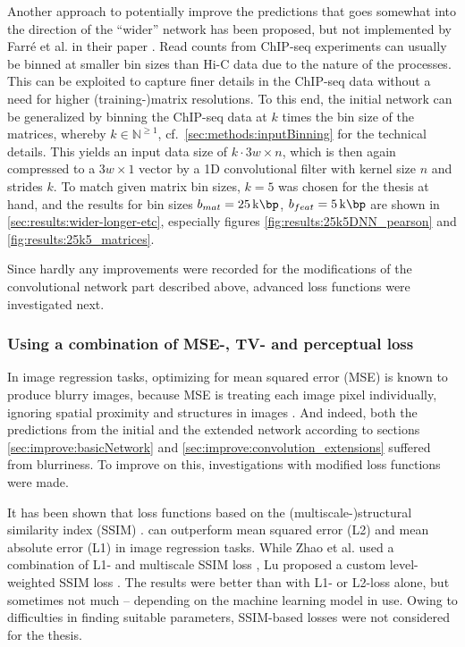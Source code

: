 Another approach to potentially improve the predictions that goes somewhat into
the direction of the ``wider'' network has been proposed, but not implemented by Farr\'e et al. 
in their paper \cite{Farre2018a}.
Read counts from ChIP-seq experiments can usually be binned at smaller bin sizes than Hi-C data due to the nature of 
the processes. 
This can be exploited to capture finer details in the ChIP-seq data without a need for higher (training-)matrix resolutions.
To this end, the initial network can be generalized by binning the ChIP-seq data at $k$ times the bin size of the matrices, 
whereby $k \in \mathbb{N}^{\geq1}$, cf.~\cref{sec:methods:inputBinning} for the technical details.
This yields an input data size of $k \cdot 3w \times n$, which is then again compressed to a $3w \times 1$ vector 
by a 1D convolutional filter with kernel size $n$ and strides $k$. 
To match given matrix bin sizes, $k=5$ was chosen for the thesis at hand, 
and the results for bin sizes $b_{mat}=\SI{25}{\kilo\bp}$, $b_{feat}=\SI{5}{\kilo\bp}$ are shown in \cref{sec:results:wider-longer-etc},
especially figures \ref{fig:results:25k5DNN_pearson} and \ref{fig:results:25k5_matrices}.

Since hardly any improvements were recorded for the modifications of the convolutional network part described above,
advanced loss functions were investigated next.

\subsubsection{Using a combination of MSE-, TV- and perceptual loss} \label{sec:improve:combined_loss}
In image regression tasks, optimizing for mean squared error (MSE) is known to produce blurry images,
because MSE is treating each image pixel individually, ignoring spatial proximity and structures in images \cite{Isola2017,Lu2019}.
And indeed, both the predictions from the initial and the extended network according to sections \ref{sec:improve:basicNetwork} and \ref{sec:improve:convolution_extensions} 
suffered from blurriness. 
To improve on this, investigations with modified loss functions were made. 

It has been shown that loss functions based on the (multiscale-)structural similarity index (SSIM) \cite{Wang2003}. 
can outperform mean squared error (L2) and mean absolute error (L1) in image regression tasks.
While Zhao et al. used a combination of L1- and multiscale SSIM loss \cite{Zhao2017},
Lu proposed a custom level-weighted SSIM loss \cite{Lu2019}.
The results were better than with L1- or L2-loss alone, but sometimes not much -- depending on the machine learning model in use.
Owing to difficulties in finding suitable parameters, SSIM-based losses were not considered for the thesis.


